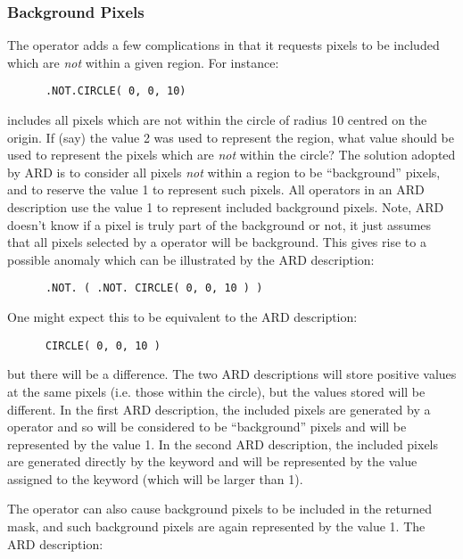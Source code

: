 \subsubsection{Background Pixels}
The  operator adds a few complications in that it requests pixels to be 
included which are {\em not} within a given region. For instance:

\small
\begin{verbatim}
      .NOT.CIRCLE( 0, 0, 10)
\end{verbatim}
\normalsize

includes all pixels which are not within the circle of radius 10 centred on the
origin. If (say) the value 2 was used to represent the  region, what value
should be used to represent the pixels which are {\em not} within the circle?
The solution adopted by ARD is to consider all pixels {\em not} within a region
to be ``background'' pixels, and to reserve the value 1 to represent such
pixels. All  operators in an ARD description use the value 1 to represent
included background pixels. Note, ARD doesn't know if a pixel is truly part of 
the background or not, it just assumes that all pixels selected by a  
operator will be background. This gives rise to a possible anomaly which can be 
illustrated by the ARD description:

\small
\begin{verbatim}
      .NOT. ( .NOT. CIRCLE( 0, 0, 10 ) )
\end{verbatim}
\normalsize

One might expect this to be equivalent to the ARD description:

\small
\begin{verbatim}
      CIRCLE( 0, 0, 10 )
\end{verbatim}
\normalsize

but there will be a difference. The two ARD descriptions will store positive
values at the same pixels (i.e. those within the circle), but the values stored
will be different. In the first ARD description, the included pixels are
generated by a  operator and so will be considered to be ``background''
pixels and will be represented by the value 1. In the second ARD description,
the included pixels are generated directly by the  keyword and will be
represented by the value assigned to the keyword (which will be larger than 1).

The  operator can also cause background pixels to be included in the 
returned mask, and such background pixels are again represented by the value 1.
The ARD description:

